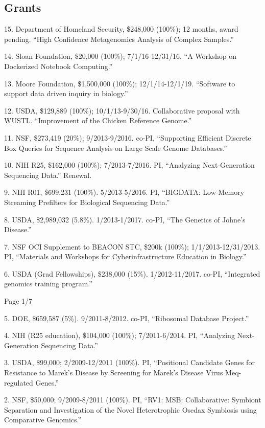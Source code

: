 \documentclass[margin,line]{resume}
\begin{document}
\begin{resume}
\section{\mysidestyle Grants}


15. Department of Homeland Security, \$248,000 (100\%); 12 months, award pending. ``High Confidence Metagenomics Analysis of Complex Samples.''

14. Sloan Foundation, \$20,000 (100\%); 7/1/16-12/31/16. ``A Workshop on Dockerized Notebook Computing.''

13. Moore Foundation, \$1,500,000 (100\%); 12/1/14-12/1/19.  ``Software to support data driven inquiry in biology.''

12. USDA, \$129,889 (100\%); 10/1/13-9/30/16.  Collaborative proposal with WUSTL. ``Improvement of the Chicken Reference Genome.''

11. NSF, \$273,419 (20\%); 9/2013-9/2016. co-PI, ``Supporting Efficient Discrete Box Queries for Sequence Analysis on Large Scale Genome Databases.''

10. NIH R25, \$162,000 (100\%); 7/2013-7/2016.  PI, ``Analyzing Next-Generation Sequencing Data.'' Renewal.

9. NIH R01, \$699,231 (100\%). 5/2013-5/2016. PI, ``BIGDATA: Low-Memory Streaming Prefilters for Biological Sequencing Data.''

8. USDA, \$2,989,032 (5.8\%). 1/2013-1/2017.  co-PI, ``The Genetics of Johne's Disease.''

7. NSF OCI Supplement to BEACON STC, \$200k (100\%); 1/1/2013-12/31/2013.  PI, ``Materials and Workshops for Cyberinfrastructure Education in Biology.''

6. USDA (Grad Fellowships), \$238,000 (15\%).  1/2012-11/2017.  co-PI, ``Integrated genomics training program.''

\vspace{2cm}
{\centerline {Page 1/7}}

\newpage

5. DOE, \$659,587 (5\%).  9/2011-8/2012.  co-PI, ``Ribosomal Database Project.''

4. NIH (R25 education), \$104,000 (100\%); 7/2011-6/2014.  PI, ``Analyzing Next-Generation Sequencing Data.''

3. USDA, \$99,000; 2/2009-12/2011 (100\%).  PI, ``Positional Candidate Genes for Resistance to Marek's
Disease by Screening for Marek's Disease Virus Meq-regulated Genes.''

2. NSF, \$50,000; 9/2009-8/2011 (100\%).  PI, ``RV1: MSB: Collaborative: Symbiont Separation and Investigation of the Novel Heterotrophic Osedax Symbiosis using Comparative Genomics.''


\end{resume}
\end{document}
